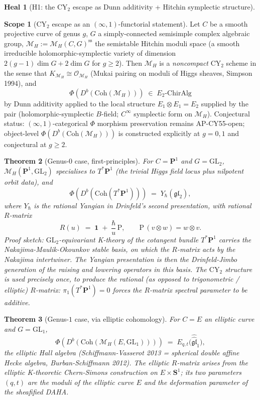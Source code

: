 \documentclass[11pt]{amsart}
\newtheorem{theorem}{Theorem}
\theoremstyle{definition}
\newtheorem{heal}[attack]{Heal}
\newtheorem{scope}[theorem]{Scope}
\providecommand{\CY}{\mathrm{CY}}
\providecommand{\Coh}{\mathrm{Coh}}
\providecommand{\Eone}{E_1}
\providecommand{\Etwo}{E_2}
\providecommand{\cM}{\mathcal{M}}
\providecommand{\cO}{\mathcal{O}}
\providecommand{\fgl}{\mathfrak{gl}}
\providecommand{\bP}{\mathbf{P}}
\providecommand{\bS}{\mathbf{S}}
\begin{document}
\begin{heal}[H1: the $\CY_2$ escape as Dunn additivity + Hitchin symplectic structure]\leavevmode

\begin{scope}[CY$_2$ escape as an $(\infty,1)$-functorial statement]\label{scope:cy2-escape}
Let $C$ be a smooth projective curve of genus $g$, $G$ a simply-connected
semisimple complex algebraic group, $\cM_H := \cM_H(C,G)^{\mathrm{ss}}$
the semistable Hitchin moduli space (a smooth irreducible
holomorphic-symplectic variety of dimension $2(g-1)\dim G + 2\dim G$
for $g \geq 2$). Then $\cM_H$ is a {\em noncompact} $\CY_2$ scheme in
the sense that $K_{\cM_H} \cong \cO_{\cM_H}$ (Mukai pairing on moduli
of Higgs sheaves, Simpson 1994), and
\[
 \Phi(D^b(\Coh(\cM_H)))
 \;\in\; \Etwo\text{-}\mathrm{ChirAlg}
\]
by Dunn additivity applied to the local structure $\Eone \otimes \Eone = \Etwo$
supplied by the pair (holomorphic-symplectic $B$-field; $C^\infty$
symplectic form on $\cM_H$). Conjectural status: $(\infty,1)$-categorical
$\Phi$ morphism preservation remains AP-CY55-open; object-level
$\Phi(D^b(\Coh(\cM_H)))$ is constructed explicitly at $g = 0, 1$ and
conjectural at $g \geq 2$.
\end{scope}

\begin{theorem}[Genus-$0$ case, first-principles]\label{thm:g0-yangian}
For $C = \bP^1$ and $G = \mathrm{GL}_2$, $\cM_H(\bP^1, \mathrm{GL}_2)$
specialises to $T^*\bP^1$ (the trivial Higgs field locus plus nilpotent
orbit data), and
\[
 \Phi(D^b(\Coh(T^*\bP^1))) \;=\; Y_\hbar(\fgl_2),
\]
where $Y_\hbar$ is the rational Yangian in Drinfeld's second presentation,
with rational $R$-matrix
\[
 R(u) \;=\; \mathbf{1} \;+\; \frac{\hbar}{u}\,\mathrm{P}, \qquad
 \mathrm{P}\,(v\otimes w) = w\otimes v.
\]
Proof sketch: $\mathrm{GL}_2$-equivariant K-theory of the cotangent
bundle $T^*\bP^1$ carries the Nakajima-Maulik-Okounkov stable basis,
on which the $R$-matrix acts by the Nakajima intertwiner. The Yangian
presentation is then the Drinfeld-Jimbo generation of the raising and
lowering operators in this basis. The $\CY_2$ structure is used
precisely once, to produce the rational (as opposed to trigonometric
/ elliptic) $R$-matrix: $\pi_1(T^*\bP^1) = 0$ forces the $R$-matrix
spectral parameter to be additive.
\end{theorem}

\begin{theorem}[Genus-$1$ case, via elliptic cohomology]\label{thm:g1-eht}
For $C = E$ an elliptic curve and $G = \mathrm{GL}_1$,
\[
 \Phi(D^b(\Coh(\cM_H(E, \mathrm{GL}_1)))) \;=\; E_{q,t}\bigl(\widehat{\widehat{\fgl}}_1\bigr),
\]
the elliptic Hall algebra (Schiffmann-Vasserot 2013 = spherical
double affine Hecke algebra, Burban-Schiffmann 2012).  The elliptic
$R$-matrix arises from the elliptic K-theoretic Chern-Simons
construction on $E \times \bS^1$; its two parameters $(q,t)$ are the
moduli of the elliptic curve $E$ and the deformation parameter of the
sheafified DAHA.
\end{theorem}


\end{heal}
\end{document}
